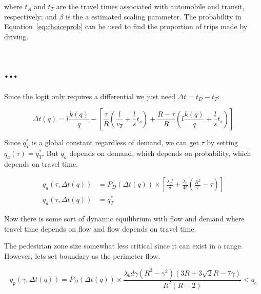 \documentclass{article}
\begin{document}
\noindent where $t_A$ and $t_T$ are the travel times associated with automobile and transit, respectively; and $\beta$ is the a estimated scaling parameter. The probability in Equation~\eqref{eq:choiceprob} can be used to find the proportion of trips made by driving.


\section{...}

Since the logit only requires a differential we just need $\Delta t = t_D - t_T$:

\begin{equation}
    \Delta t(q) = l \frac{k(q)}{q} - \left[
    \frac{\tau}{R} \left( \frac{l}{v_T} + \frac{l}{s}t_s \right) + \frac{R-\tau}{R} \left( l\frac{k(q)}{q} + \frac{l}{s}t_s \right) \right]
\end{equation}

\noindent Since $q^*_T$ is a global constant regardless of demand, we can get $\tau$ by setting $q_a(\tau)=q^*_T$. But $q_a$ depends on demand, which depends on probability, which depends on travel time.

\begin{align}
    q_a(\tau, \Delta t(q)) & = P_D(\Delta t(q)) \times \left[ \frac{\lambda_b l}{\delta} + \frac{\lambda_c}{4\delta} \left( \frac{R^2}{\tau} - \tau \right) \right] \\
    q_a(\tau, \Delta t(q)) & = q^*_T
\end{align}

\noindent Now there is some sort of dynamic equilibrium with flow and demand where travel time depends on flow and flow depends on travel time. 

The pedestrian zone size somewhat less critical since it can exist in a range. However, lets set boundary as the perimeter flow.

\begin{equation}
        q_p(\gamma, \Delta t(q)) = P_D(\Delta t(q)) \times \frac{\lambda_b d \gamma (R^2 - \gamma^2) (3R + 3\sqrt{2}R - 7\gamma)}{R^2(R-2)} < q_c
\end{equation}
\end{document}
